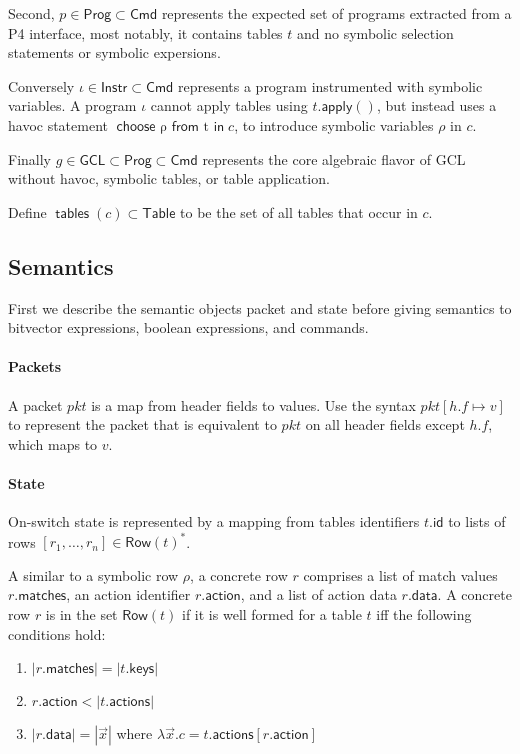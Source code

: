 \documentclass{article}
\newcommand{\pkt}{\mathit{pkt}}
\newcommand{\Cmd}{\mathsf{Cmd}}
\newcommand{\Instr}{\mathsf{Instr}}
\newcommand{\Prog}{\mathsf{Prog}}
\newcommand{\GCL}{\mathsf{GCL}}
\newcommand{\Table}{\mathsf{Table}}
\newcommand{\Row}{\mathsf{Row}}
\newcommand{\matches}{\mathsf{matches}}
\newcommand{\action}{\mathsf{action}}
\newcommand{\actions}{\mathsf{actions}}
\newcommand{\keys}{\mathsf{keys}}
\newcommand{\data}{\mathsf{data}}
\newcommand{\id}{\mathsf{id}}
\newcommand{\apply}{\mathsf{apply}}
\renewcommand{\choose}[2]{\mathop{\mathsf{choose}~#1~\mathsf{from}~#2~\mathsf{in}}}
\newcommand{\tables}{\mathop{\mathsf{tables}}}
\begin{document}
Second, $p \in \Prog \subset \Cmd$ represents the expected set of programs extracted from a
P4 interface, most notably, it contains tables $t$ and no symbolic selection
statements or symbolic expersions.

Conversely $\iota \in \Instr \subset \Cmd$ represents a program instrumented
with symbolic variables. A program $\iota$ cannot apply tables using
$t.\apply()$, but instead uses a havoc statement $\choose \rho t c$, to
introduce symbolic variables $\rho$ in $c$.

Finally $g \in \GCL \subset \Prog \subset \Cmd$ represents the core algebraic
flavor of GCL without havoc, symbolic tables, or table application.


Define $\tables(c) \subset \Table$ to be the set of all tables that occur in $c$.

\subsection{Semantics}

First we describe the semantic objects packet and state before giving semantics
to bitvector expressions, boolean expressions, and commands.

\paragraph{Packets}
A packet $\pkt$ is a map from header fields to values. Use the syntax $\pkt[h.f
  \mapsto v]$ to represent the packet that is equivalent to $\pkt$ on all header
fields except $h.f$, which maps to $v$.

\paragraph{State}
On-switch state is represented by a mapping from tables identifiers $t.\id$ to
lists of rows $[r_1,\ldots,r_n] \in \Row(t)^*$.

A similar to a symbolic row $\rho$, a concrete row $r$ comprises a list of match
values $r.\matches$, an action identifier $r.\action$, and a list of action data
$r.\data$. A concrete row $r$ is in the set $\Row(t)$ if it is well formed for a
table $t$ iff the following conditions hold:
\begin{enumerate}
\item $|r.\matches| = |t.\keys|$
\item $r.\action < |t.\actions|$
\item $|r.\data| = |\vec x|$ where $\lambda \vec x. c = t.\actions[r.\action]$
\end{enumerate}\
\end{document}
